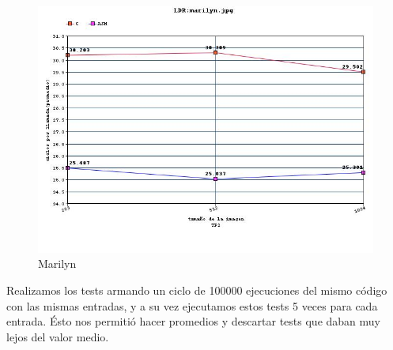 \begin{figure}
  \begin{center}
	\includegraphics[scale=0.66]{imagenes/ldr-marilyn.jpg}
	\caption{Marilyn}
	\label{Marilyn}
  \end{center}
\end{figure}

Realizamos los tests armando un ciclo de 100000 ejecuciones del mismo c\'odigo con las mismas entradas, y a su vez ejecutamos estos tests 5 veces para cada entrada. \'Esto nos 
permiti\'o hacer promedios y descartar tests que daban muy lejos del valor medio.

